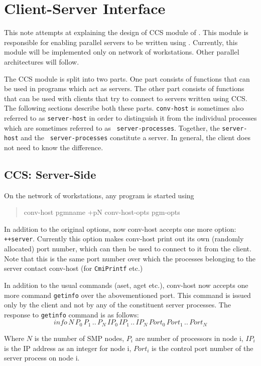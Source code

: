 \chapter{\converse{} Client-Server Interface}

This note attempts at explaining the design of CCS module of \converse{}. This
module is responsible for enabling parallel servers to be written using
\converse{}. Currently, this module will be implemented only on network of
workstations. Other parallel architectures will follow.

The CCS module is split into two parts. One part consists of functions that can
be used in \converse{} programs which act as servers. The other part consists of
functions that can be used with clients that try to connect to servers written
using CCS. The following sections describe both these parts. {\tt conv-host} is
sometimes also referred to as {\tt server-host} in order to distinguish it from
the individual \converse{} processes which are sometimes referred to as {\tt
server-processes}. Together, the {\tt server-host} and the {\tt
server-processes} constitute a server. In general, the client does not need to
know the difference.


\section{CCS: Server-Side}

On the network of workstations, any \converse{} program is started using
\begin{quotation} conv-host pgmname +pN conv-host-opts pgm-opts \end{quotation}
In addition to the original options, now conv-host accepts one more option:
{\tt ++server}.  Currently this option makes conv-host print out its own
(randomly allocated) port number, which can then be used to connect to it from
the client. Note that this is the same port number over which the processes
belonging to the server contact conv-host (for {\tt CmiPrintf} etc.)

In addition to the usual commands (aset, aget etc.), conv-host now accepts one
more command {\tt getinfo} over the abovementioned port. This command is issued
only by the client and not by any of the constituent server processes. The
response to {\tt getinfo} command is as follows: 
\[info \, N \, P_{0} \, P_{1} \, .. \, P_{N} \, IP_{0} \, IP_{1} \, .. \,
IP_{N} \, Port_{0} \, Port_{1} \, .. \, Port_{N} \]

Where \(N\)  is the number of SMP nodes, \(P_{i}\)  are number of processors in
node i, \(IP_{i}\) is the IP address as an integer for node i, \(Port_{i}\) is
the control port number of the server process on node i.

